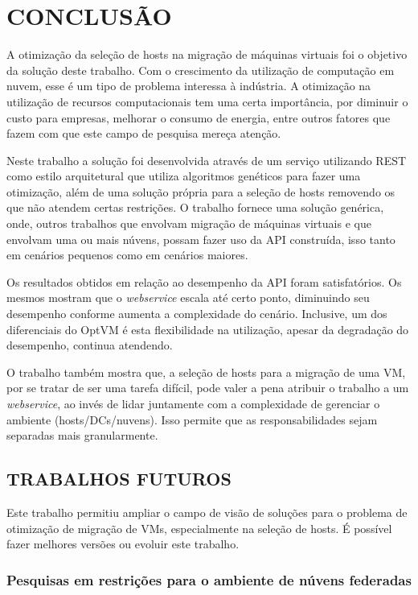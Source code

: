 \chapter{CONCLUSÃO}
\label{chap:conclusao}
A otimização da seleção de hosts na migração de máquinas virtuais
foi o objetivo da solução deste trabalho. Com o crescimento da 
utilização de computação em nuvem, esse é um tipo de problema interessa à indústria. 
A otimização na utilização de recursos 
computacionais tem uma certa importância, por diminuir o custo para empresas,
melhorar o consumo de energia, entre outros fatores que fazem com que este
campo de pesquisa mereça atenção.

Neste trabalho a solução foi desenvolvida através de um serviço utilizando REST 
como estilo arquitetural que utiliza algoritmos genéticos para fazer uma otimização, 
além de uma solução própria para a seleção de hosts removendo os que não atendem
certas restrições. 
O trabalho fornece uma solução genérica, onde, outros trabalhos que 
envolvam migração de máquinas virtuais e que envolvam uma ou mais núvens, 
possam fazer uso da API construída, isso tanto em cenários pequenos como em 
cenários maiores.

Os resultados obtidos em relação ao desempenho da API foram satisfatórios.
Os mesmos mostram que o \textit{webservice} escala até certo ponto, diminuindo
seu desempenho conforme aumenta a complexidade do cenário. Inclusive, um dos
diferenciais do OptVM é esta flexibilidade na utilização, apesar da degradação 
do desempenho, continua atendendo.

O trabalho também mostra que, a seleção de hosts para a migração de uma VM,
por se tratar de ser uma tarefa difícil, 
pode valer a pena atribuir o trabalho a um \textit{webservice}, ao invés de lidar 
juntamente com a complexidade de gerenciar o ambiente (hosts/DCs/nuvens). Isso permite
que as responsabilidades sejam separadas mais granularmente.

\section{TRABALHOS FUTUROS}
\label{sec:trabalhosFuturos}

Este trabalho permitiu ampliar o campo de visão de soluções para
o problema de otimização de migração de VMs, especialmente na seleção
de hosts. É possível fazer melhores versões ou evoluir este trabalho.

\subsection{Pesquisas em restrições para o ambiente de núvens federadas}

